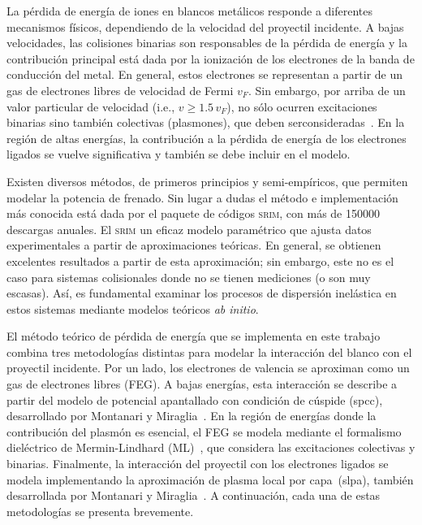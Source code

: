 La pérdida de energía de iones en blancos metálicos responde a 
diferentes mecanismos físicos, dependiendo de la velocidad del proyectil 
incidente. A bajas velocidades, las colisiones binarias son responsables 
de la pérdida de energía y la contribución principal está dada por la 
ionización de los electrones de la banda de conducción del metal. En 
general, estos electrones se representan a partir de un gas de 
electrones libres de velocidad de Fermi $v_F$. Sin embargo, por arriba 
de un valor particular de velocidad (i.e., $v\geq 1.5\,v_F$), no sólo 
ocurren excitaciones binarias sino también colectivas (plasmones), que 
deben serconsideradas~\cite{Montanari:17}. En la región de altas 
energías, la contribución a la pérdida de energía de los electrones 
ligados se vuelve significativa y también se debe incluir en el modelo.

Existen diversos métodos, de primeros principios y semi-empíricos, que 
permiten modelar la potencia de frenado. Sin lugar a dudas el método e
implementación más conocida está dada por el paquete de códigos 
\textsc{srim}, con más de 150000 descargas anuales. El \textsc{srim} un
eficaz modelo paramétrico que ajusta datos experimentales a partir de 
aproximaciones teóricas. En general, se obtienen excelentes resultados 
a partir de esta aproximación; sin embargo, este no es el caso para 
sistemas colisionales donde no se tienen mediciones (o son muy escasas). 
Así, es fundamental examinar los procesos de dispersión inelástica en 
estos sistemas mediante modelos teóricos \textit{ab initio}.

El método teórico de pérdida de energía que se implementa en este 
trabajo combina tres metodologías distintas para modelar la interacción 
del blanco con el proyectil incidente. Por un lado, los electrones de 
valencia se aproximan como un gas de electrones libres (FEG). A bajas 
energías, esta interacción se describe a partir del modelo de potencial 
apantallado con condición de cúspide (\acs{spcc}), desarrollado por 
Montanari y Miraglia~\cite{Montanari:17}. En la región de energías donde 
la contribución del plasmón es esencial, el FEG se modela mediante el 
formalismo dieléctrico de Mermin-Lindhard (ML)~\cite{Mermin:70}, que 
considera las excitaciones colectivas y binarias. Finalmente, la 
interacción del proyectil con los electrones ligados se modela 
implementando la aproximación de plasma local por capa~(\acs{slpa}), 
también desarrollada por Montanari y 
Miraglia~\cite{Montanari:17,Montanari:13}. A continuación, cada una de 
estas metodologías se presenta brevemente.

